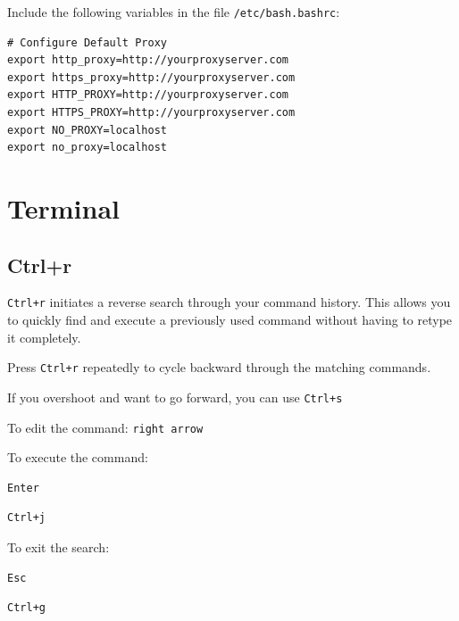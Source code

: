 \documentclass{article}
\newenvironment{codetemplate}[1][]{%
  \mybasecolorbox[#1]
  \itshape
}{%
  \endmybasecolorbox
}
\begin{document}
Include the following variables in the file \verb|/etc/bash.bashrc|:\begin{codetemplate}{}
\begin{verbatim}
# Configure Default Proxy
export http_proxy=http://yourproxyserver.com
export https_proxy=http://yourproxyserver.com
export HTTP_PROXY=http://yourproxyserver.com
export HTTPS_PROXY=http://yourproxyserver.com
export NO_PROXY=localhost
export no_proxy=localhost
\end{verbatim}
\end{codetemplate}

\newpage
\section{Terminal}

\subsection{Ctrl+r}

\verb|Ctrl+r| initiates a reverse search through your command history. This allows you to quickly find and execute a previously used command without having to retype it completely.

Press \verb|Ctrl+r| repeatedly to cycle backward through the matching commands.

If you overshoot and want to go forward, you can use \verb|Ctrl+s|

To edit the command: \verb|right arrow|

To execute the command:
\begin{codetemplate}
\begin{verbatim}
Enter
\end{verbatim}
\end{codetemplate}
\begin{codetemplate}
\begin{verbatim}
Ctrl+j
\end{verbatim}
\end{codetemplate}

To exit the search:
\begin{codetemplate}
\begin{verbatim}
Esc
\end{verbatim}
\end{codetemplate}
\begin{codetemplate}
\begin{verbatim}
Ctrl+g
\end{verbatim}
\end{codetemplate}
\end{document}
